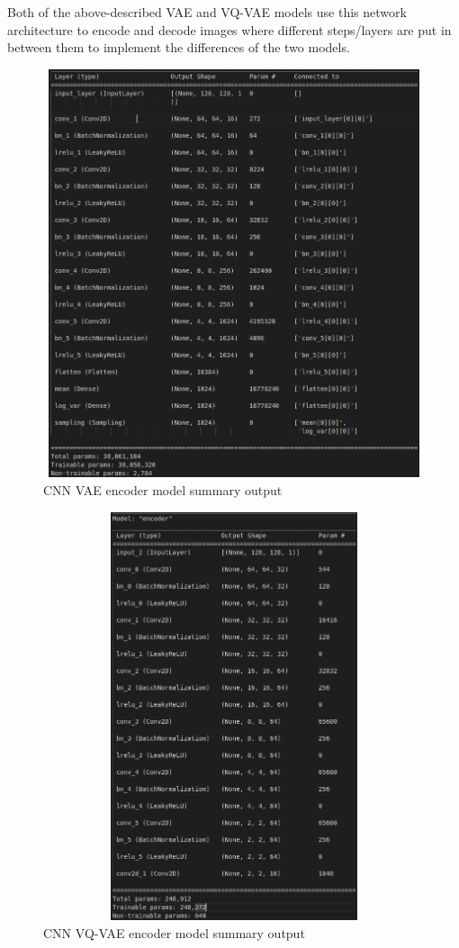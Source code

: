 Both of the above-described VAE and VQ-VAE models use this network architecture to encode and decode images where different steps/layers are put in between them to implement the differences of the two models.

\newpage

\begin{figure}[ht]
    \centering
    \includegraphics[width = 14cm, height = 12cm]{images/cnn-vae-encoder-output.png}
    \caption[CNN VAE encoder model summary output]{CNN VAE encoder model summary output}
    \label{fig:cnnvaeencoderoutput}
\end{figure}

\newpage

\begin{figure}[ht]
    \centering
    \includegraphics[width = 14cm, height = 12cm]{images/cnn-vqvae-encoder-output.png}
    \caption[CNN VQ-VAE encoder model summary output]{CNN VQ-VAE encoder model summary output}
    \label{fig:cnnvqvaeencoderoutput}
\end{figure}

